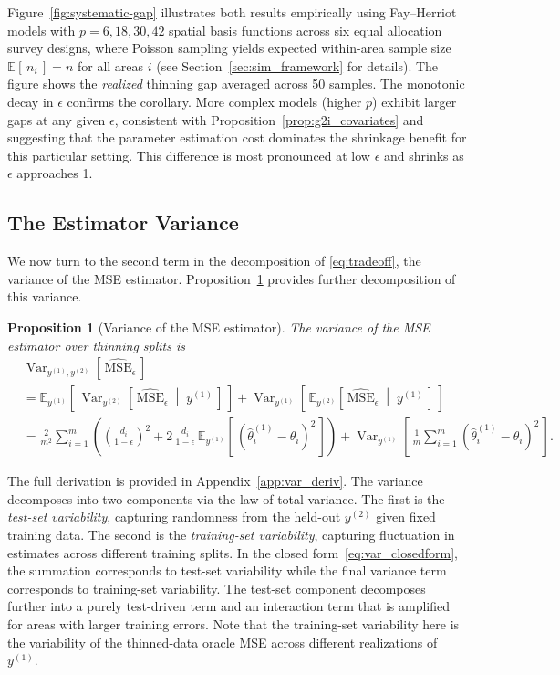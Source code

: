 \documentclass[11pt]{article}
\newcommand{\agiven}{\;\middle|\;}  %
\newcommand{\thetatrain}{\hat{\theta}^{(1)}}           %
\newcommand{\ytrain}{y^{(1)}}                           %
\newcommand{\ytest}{y^{(2)}}                            %
\newcommand{\msehat}{\widehat{\mathrm{MSE}}_{\epsilon}}
\newcommand{\E}[2][]{\mathbb{E}_{#1}\!\left[\,#2\,\right]}
\newcommand{\Var}[2][]{\operatorname{Var}_{#1}\!\left[\,#2\,\right]}
\newcommand{\Varthin}[1]{\Var[\ytrain, \ytest]{#1}}
\theoremstyle{plain}
\newtheorem{proposition}[theorem]{Proposition}
\theoremstyle{definition}
\theoremstyle{remark}
\begin{document}
Figure~\ref{fig:systematic-gap} illustrates both results empirically using Fay--Herriot models with $p = 6, 18, 30, 42$ spatial basis functions across six equal allocation survey designs, where Poisson sampling yields expected within-area sample size $\E{n_i}=n$ for all areas $i$ (see Section~\ref{sec:sim_framework} for details). The figure shows the \textit{realized} thinning gap averaged across 50 samples. The monotonic decay in $\epsilon$ confirms the corollary. More complex models (higher $p$) exhibit larger gaps at any given $\epsilon$, consistent with Proposition~\ref{prop:g2i_covariates} and suggesting that the parameter estimation cost dominates the shrinkage benefit for this particular setting. This difference is most pronounced at low $\epsilon$ and shrinks as $\epsilon$ approaches 1.


\subsection{The Estimator Variance}\label{sec:variance}

We now turn to the second term in the decomposition of \eqref{eq:tradeoff}, the variance of the MSE estimator. Proposition~\ref{prop:mse_variance} provides further decomposition of this variance.

\begin{proposition}[Variance of the MSE estimator]
\label{prop:mse_variance}
The variance of the MSE estimator over thinning splits is
\begin{align}
    &\Varthin{\msehat}  \nonumber \\
    &= \E[\ytrain]{ \Var[\ytest]{ \msehat \agiven \ytrain} }
 + \Var[\ytrain]{ \E[\ytest]{\msehat \agiven \ytrain } }  \label{eq:var_lotv} \\
  &=  \frac{2}{m^2}\sum_{i=1}^m \left(
\left(\tfrac{d_i}{1-\epsilon}\right)^{\!2} + 2\,\tfrac{d_i}{1-\epsilon}\,\E[\ytrain]{(\thetatrain_i - \theta_i)^2}
\right) + \Var[\ytrain]{\frac{1}{m}\sum_{i=1}^m \left( \thetatrain_i - \theta_i \right)^2}.
\label{eq:var_closedform}
\end{align}
\end{proposition}
The full derivation is provided in Appendix~\ref{app:var_deriv}. The variance decomposes into two components via the law of total variance. The first is the \emph{test-set variability}, capturing randomness from the held-out $\ytest$ given fixed training data. The second is the \emph{training-set variability}, capturing fluctuation in estimates across different training splits. In the closed form~\eqref{eq:var_closedform}, the summation corresponds to test-set variability while the final variance term corresponds to training-set variability. The test-set component decomposes further into a purely test-driven term and an interaction term that is amplified for areas with larger training errors. Note that the training-set variability here is the variability of the thinned-data oracle MSE across different realizations of $\ytrain$.
\end{document}
